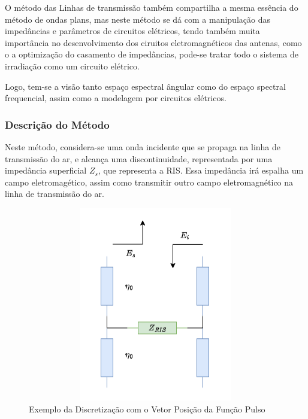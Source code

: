 \documentclass[
	12pt,				%
	openright,			%
	oneside,			%
	a4paper,			%
	english,			%
	brazil				%
	]{abntex2}
\begin{document}
O método das Linhas de transmissão também compartilha a mesma essência do método de ondas plans, mas neste método se dá com a manipulação das impedâncias e parâmetros de circuitos elétricos, tendo também muita importância no desenvolvimento dos ciruitos eletromagnéticos das antenas, como o a optimização do casamento de impedâncias, pode-se tratar todo o sistema de irradiação como um circuito elétrico.

Logo, tem-se a visão tanto espaço espectral ângular como do espaço spectral frequencial, assim como a modelagem por circuitos elétricos.

\subsubsection{Descrição do Método}  

Neste método, considera-se uma onda incidente que se propaga na linha de transmissão do ar, e alcança uma discontinuidade, representada por uma impedância superficial $Z_s$, que representa a RIS. Essa impedância irá espalha um campo eletromagético, assim como transmitir outro campo eletromagnético na linha de transmissão do ar.

\begin{figure}[htb]
 \label{PulsosVetorPosicaoIlustracao}
 \centering
  \begin{minipage}{\textwidth}
    \centering
    \caption{Exemplo da Discretização com o Vetor Posição da Função Pulso} \label{fig_minipage_imagem2}
    \includegraphics[width=14cm, height=8.5cm]{figures/AirTL.png}
  \end{minipage}
  \hfill

\end{figure}
\end{document}

